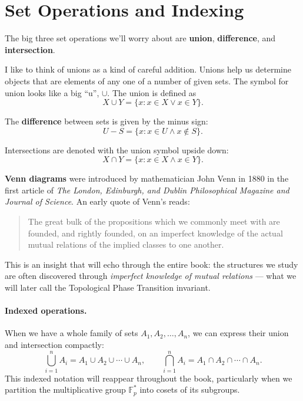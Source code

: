 \section{Set Operations and Indexing}

The big three set operations we'll worry about are \textbf{union},
\textbf{difference}, and \textbf{intersection}.

I like to think of unions as a kind of careful addition. Unions help us
determine objects that are elements of any one of a number of given sets.
The symbol for union looks like a big ``u'', $\cup$. The union is defined as
\[
    X \cup Y = \{x : x \in X \vee x \in Y\}.
\]

The \textbf{difference} between sets is given by the minus sign:
\[
    U - S = \{x : x \in U \wedge x \notin S\}.
\]

Intersections are denoted with the union symbol upside down:
\[
    X \cap Y = \{x : x \in X \wedge x \in Y\}.
\]

\textbf{Venn diagrams} were introduced by mathematician John Venn in 1880 in
the first article of \emph{The London, Edinburgh, and Dublin Philosophical
Magazine and Journal of Science}. An early quote of Venn's reads:

\begin{quote}
    The great bulk of the propositions which we commonly meet with are founded,
    and rightly founded, on an imperfect knowledge of the actual mutual
    relations of the implied classes to one another.
\end{quote}

\noindent This is an insight that will echo through the entire book: the
structures we study are often discovered through \emph{imperfect knowledge
of mutual relations} --- what we will later call the Topological Phase Transition
invariant.

\paragraph{Indexed operations.}
When we have a whole family of sets $A_1, A_2, \ldots, A_n$, we can express
their union and intersection compactly:
\[
    \bigcup_{i=1}^{n} A_i = A_1 \cup A_2 \cup \cdots \cup A_n,
    \qquad
    \bigcap_{i=1}^{n} A_i = A_1 \cap A_2 \cap \cdots \cap A_n.
\]
This indexed notation will reappear throughout the book, particularly when we
partition the multiplicative group $\mathbb{F}_p^*$ into cosets of its
subgroups.


